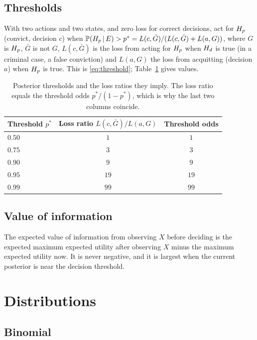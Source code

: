 \subsection{Thresholds}

With two actions and two states, and zero loss for correct decisions, act for $H_{p}$ (convict, decision $c$) when $\mathbb{P}(H_{p}\,\vert\, E) > p^\ast = L(c,\bar G)/(L(c,\bar G) + L(a,G))$, where $G$ is $H_{p}$, $\bar G$ is not $G$, $L(c,\bar G)$ is the loss from acting for $H_{p}$ when $H_{d}$ is true (in a criminal case, a false conviction) and $L(a,G)$ the loss from acquitting (decision $a$) when $H_{p}$ is true. This is \eqref{eq:threshold}; Table~\ref{tab:thresholds} gives values.

\begin{table}[ht]
\centering\small
\begin{tabular}{lcc}
\toprule
Threshold $p^\ast$ & Loss ratio $L(c,\bar G)/L(a,G)$ & Threshold odds\\
\midrule
$0.50$ & $1$ & $1$\\
$0.75$ & $3$ & $3$\\
$0.90$ & $9$ & $9$\\
$0.95$ & $19$ & $19$\\
$0.99$ & $99$ & $99$\\
\bottomrule
\end{tabular}
\caption{Posterior thresholds and the loss ratios they imply. The loss ratio equals the threshold odds $p^\ast/(1-p^\ast)$, which is why the last two columns coincide.}
\label{tab:thresholds}
\end{table}

\subsection{Value of information}

The expected value of information from observing $X$ before deciding is the expected maximum expected utility after observing $X$ minus the maximum expected utility now. It is never negative, and it is largest when the current posterior is near the decision threshold.

\section{Distributions}

\subsection{Binomial}

